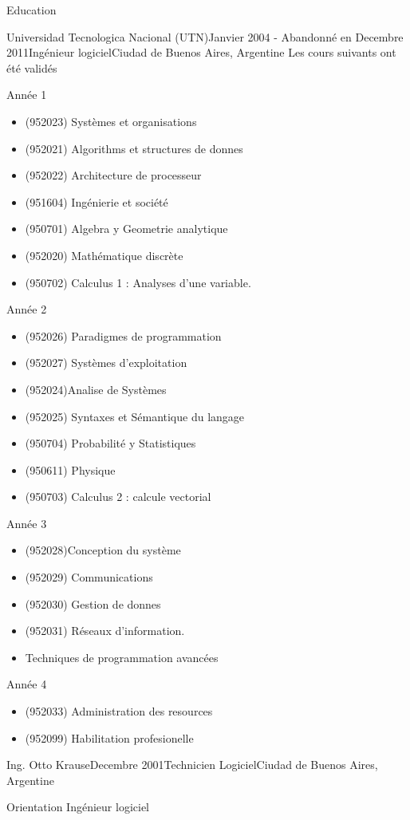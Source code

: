 \documentclass{resume} %
\begin{document}
\begin{rSection}{Education}
	\begin{rSubsection}{Universidad Tecnologica Nacional (UTN)}{Janvier 2004 - Abandonn\'{e} en Decembre 2011}{Ing\'{e}nieur logiciel}{Ciudad de Buenos Aires, Argentine}
	Les cours suivants ont \'et\'e valid\'es
		\item Ann\'ee 1 
		\begin{itemize}
			\item (952023) Syst\`{e}mes et organisations 
			\item (952021) Algorithms et structures de donnes 
			\item (952022) Architecture de processeur 
			\item (951604) Ing\'{e}nierie et soci\'{e}t\'{e} 
			\item (950701) Algebra y Geometrie analytique 
			\item (952020) Math\'{e}matique discr\`{e}te
			\item (950702) Calculus 1 : Analyses d'une variable. 
		\end{itemize}
		\item Ann\'ee 2
		\begin{itemize}
			\item(952026) Paradigmes de programmation 
			\item(952027) Syst\`{e}mes d'exploitation 
			\item(952024)Analise de Syst\`{e}mes 
			\item(952025) Syntaxes et  S\'{e}mantique  du langage 
			\item(950704) Probabilit\'{e} y Statistiques 
			\item(950611) Physique 
			\item(950703) Calculus 2 : calcule vectorial 
		\end{itemize}
		\item Ann\'ee 3
		\begin{itemize}
			\item (952028)Conception du syst\`{e}me 
			\item (952029) Communications 
			\item (952030) Gestion de donnes 
			\item (952031) R\'{e}seaux d'information.
			\item Techniques de programmation avanc\'{e}es
		\end{itemize}
		\item Ann\'ee 4
		\begin{itemize}
			\item (952033) Administration des resources 
			\item (952099) Habilitation profesionelle 
		\end{itemize}
	\end{rSubsection}
	\begin{rSubsection}{Ing. Otto Krause}{Decembre 2001}{Technicien Logiciel}{Ciudad de Buenos Aires, Argentine}
		\item Orientation Ing\'{e}nieur logiciel
	\end{rSubsection}
\end{rSection}
\end{document}

